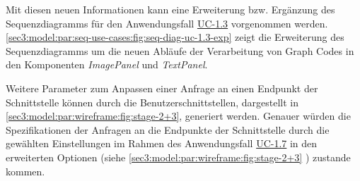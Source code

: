 


Mit diesen neuen Informationen kann eine Erweiterung bzw. Ergänzung des Sequenzdiagramms für den Anwendungsfall \hyperref[sec3:model:uc-1.3]{UC-1.3} vorgenommen werden.
\cref{sec3:model:par:seq-use-cases:fig:seq-diag-uc-1.3-exp} zeigt die Erweiterung des Sequenzdiagramms um die neuen Abläufe der Verarbeitung von Graph Codes in den Komponenten \textit{ImagePanel} und \textit{TextPanel}.



Weitere Parameter zum Anpassen einer Anfrage an einen Endpunkt der Schnittstelle können durch die Benutzerschnittstellen, dargestellt in \cref{sec3:model:par:wireframe:fig:stage-2+3}, generiert werden.
Genauer würden die Spezifikationen der Anfragen an die Endpunkte der Schnittstelle durch die gewählten Einstellungen im Rahmen des Anwendungsfall \hyperref[sec3:model:uc-1.7]{UC-1.7} in den erweiterten Optionen (siehe \cref{sec3:model:par:wireframe:fig:stage-2+3} ) zustande kommen.

